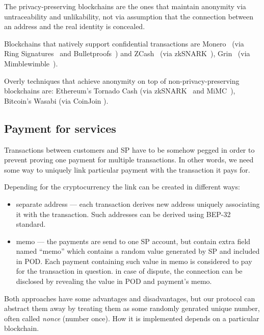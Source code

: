 \documentclass{ieeeaccess}
\begin{document}
The privacy-preserving blockchains are the ones that maintain anonymity via untraceability and unlikability, not via assumption that the connection between an address and the real identity is concealed.

Blockchains that natively support confidential transactions are
Monero~\cite{van2013cryptonote} (via Ring Signatures~\cite{cryptoeprint:2015:1098} and Bulletproofs~\cite{Bulletpr14, bunz2018bulletproofs}) and ZCash~\cite{sasson2014zerocash} (via zkSNARK~\cite{ben2013snarks}), Grin~\cite{fuchsbauer2019aggregate} (via Mimblewimble~\cite{httpsdow19}).

Overly techniques that achieve anonymity on top of non-privacy-preserving blockchains are: Ethereum's Tornado Cash\cite{pertsev2019tornado} (via zkSNARK~\cite{groth2016size} and MiMC~\cite{albrecht2016mimc}), Bitcoin's Wasabi\cite{WasabiWa56} (via CoinJoin \cite{CoinJoin41}).

\subsection{Payment for services}\label{payment-for-services}
Transactions between customers and SP have to be somehow pegged in order
to prevent proving one payment for multiple transactions. In other
words, we need some way to uniquely link particular payment with the
transaction it pays for.

Depending for the cryptocurrency the link can be created in different
ways:

\begin{itemize}

\item
  separate address --- each transaction derives new address uniquely
  associating it with the transaction. Such addresses can be derived
  using BEP-32 standard.
\item
  memo --- the payments are send to one SP account, but contain extra
  field named ``memo'' which contains a random value generated by SP and
  included in POD. Each payment containing such value in memo is
  considered to pay for the transaction in question. in case of dispute,
  the connection can be disclosed by revealing the value in POD and
  payment's memo.
\end{itemize}

Both approaches have some advantages and disadvantages, but our protocol
can abstract them away by treating them as some randomly genrated unique
number, often called \textit{nonce} (number once). How it is implemented
depends on a particular blockchain.
\end{document}
